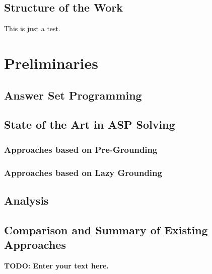 \documentclass{vutinfth} %
\newcommand{\todo}[1]{{\color{red}\textbf{TODO: {#1}}}} %
\theoremstyle{example}
\theoremstyle{definition}
\theoremstyle{theorem}
\theoremstyle{lemma}
\theoremstyle{corollary}
\begin{document}
\section{Structure of the Work} %

This is just a test.\cite{Gebser:2012:CAS:2228640.2228952}

\chapter{Preliminaries}
\label{chap:preliminaries}

\section{Answer Set Programming}


\section{State of the Art in ASP Solving}

\subsection{Approaches based on Pre-Grounding}



\subsection{Approaches based on Lazy Grounding}

\section{Analysis}

\section{Comparison and Summary of Existing Approaches}

\todo{Enter your text here.}
\end{document}
